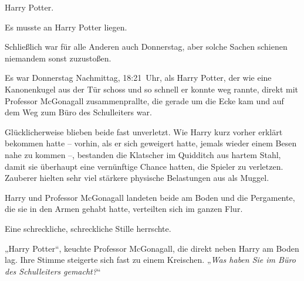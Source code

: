 \later

Harry Potter.

Es musste an Harry Potter liegen.

Schließlich war für alle Anderen auch Donnerstag, aber solche Sachen schienen niemandem sonst zuzustoßen.

Es war Donnerstag Nachmittag, 18:21~Uhr, als Harry Potter, der wie eine Kanonenkugel aus der Tür schoss und so schnell er konnte weg rannte, direkt mit Professor McGonagall zusammenprallte, die gerade um die Ecke kam und auf dem Weg zum Büro des Schulleiters war.

Glücklicherweise blieben beide fast unverletzt. Wie Harry kurz vorher erklärt bekommen hatte – vorhin, als er sich geweigert hatte, jemals wieder einem Besen nahe zu kommen –, bestanden die Klatscher im Quidditch aus hartem Stahl, damit sie überhaupt eine vernünftige Chance hatten, die Spieler zu verletzen. Zauberer hielten sehr viel stärkere physische Belastungen aus als Muggel.

Harry und Professor McGonagall landeten beide am Boden und die Pergamente, die sie in den Armen gehabt hatte, verteilten sich im ganzen Flur.

Eine schreckliche, schreckliche Stille herrschte.

„Harry Potter“, keuchte Professor McGonagall, die direkt neben Harry am Boden lag. Ihre Stimme steigerte sich fast zu einem Kreischen. „\emph{Was haben Sie im Büro des Schulleiters gemacht?}“

